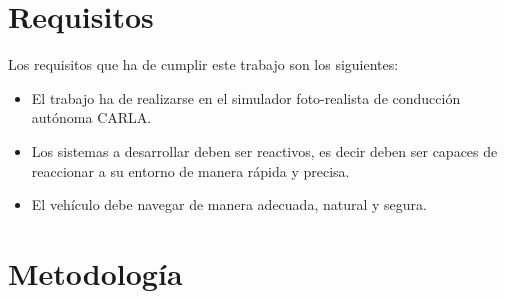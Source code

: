 \section{Requisitos}
\label{sec:requisitos}

Los requisitos que ha de cumplir este trabajo son los siguientes:
\begin{itemize}
	\item El trabajo ha de realizarse en el simulador foto-realista de conducción autónoma CARLA.
	\item Los sistemas a desarrollar deben ser reactivos, es decir deben ser capaces de reaccionar a su entorno de manera rápida y precisa.
	\item El vehículo debe navegar de manera adecuada, natural y segura.
\end{itemize}

\section{Metodología}
\label{sec:metodologia}

